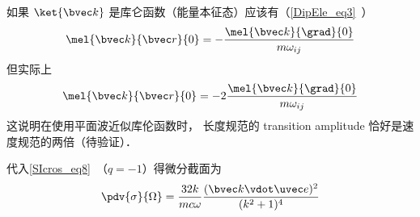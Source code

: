 如果 $\ket{\bvec k}$ 是库仑函数（能量本征态）应该有（\autoref{DipEle_eq3}~）
\begin{equation}
\mel{\bvec k}{\bvec r}{0} = -\frac{\mel{\bvec k}{\grad}{0}}{m\omega_{ij}}
\end{equation}
但实际上
\begin{equation}
\mel{\bvec k}{\bvec r}{0} = -2\frac{\mel{\bvec k}{\grad}{0}}{m\omega_{ij}}
\end{equation}
这说明在使用平面波近似库伦函数时， 长度规范的 transition amplitude 恰好是速度规范的两倍（待验证）．

代入\autoref{SIcros_eq8}~（$q = -1$）得微分截面为
\begin{equation}
\pdv{\sigma}{\Omega} = \frac{32 k}{mc\omega} \frac{(\bvec k \vdot \uvec e)^2}{(k^2 + 1)^4}
\end{equation}
